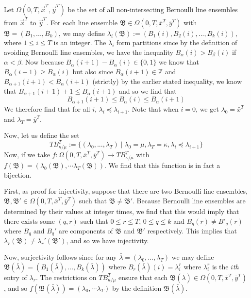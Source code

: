 \documentclass[12pt]{article}
\begin{document}
	Let $\Omega(0,T,\vec{x}^T, \vec{y}^T)$ be the set of all non-intersecting Bernoulli line ensembles from $\vec{x}^T$ to $\vec{y}^T$. For each line ensemble $\mathfrak{B}\in \Omega(0,T,\bar x^T,\bar y^T)$ with $\mathfrak B=(B_1,...,B_k)$, we may define $\lambda_i(\mathfrak B):=(B_1(i),B_2(i),...,B_k(i))$, where $1 \leqslant i\leqslant T$ is an integer. The $\lambda_i$ form partitions since by the definition of avoiding Bernoulli line ensembles, we have the inequality $B_\alpha(i)>B_\beta(i)$ if $\alpha<\beta$. 
Now because $B_\alpha(i+1)-B_\alpha(i)\in \{0,1\}$ we know that $B_\alpha(i+1)\geq B_\alpha(i)$ but also since $B_\alpha(i+1)\in \mathbb{Z}$ and $B_{\alpha+1}(i+1)<B_\alpha(i+1)$ (strictly) by the earlier stated inequality, we know that $B_{\alpha+1}(i+1)+1\leq B_\alpha(i+1)$ and so we find that 
\[B_{\alpha+1}(i+1)\leq B_\alpha(i)\leq B_\alpha(i+1)\]
We therefore find that for all $i$, $\lambda_i\preceq \lambda_{i+1}$. Note that when $i=0$, we get $\lambda_0=\bar x^T$ and $\lambda_T=\bar y^T$.

Now, let us define the set 
\[TB_{\kappa/\mu}^T:=\{(\lambda_0,...,\lambda_T)\mid \lambda_0=\mu, \lambda_T=\kappa, \lambda_i\preceq\lambda_{i+1}\}\] 
Now, if we take $f:\Omega(0,T,\bar x^T, \bar y ^T)\to TB_{\kappa/\mu}^T$ with $f(\mathfrak{B})= (\lambda_0(\mathfrak{B}),\cdots \lambda_T(\mathfrak{B}))$. We find that this function is in fact a bijection. 

First, as proof for injectivity, suppose that there are two Bernoulli line ensembles, $\mathfrak{B}, \mathfrak{B}'\in \Omega(0,T,\bar x^T, \bar y ^T)$ such that $\mathfrak{B}\neq \mathfrak{B'}$.
Because Bernoulli line ensembles are determined by their values at integer times, we find that this would imply that there exists some $(q,r)$ such that $0\leq r\leq T$, $0\leq q \leq k$ and $B_q(r)\neq B'_q(r)$ where $B_q$ and $B_q'$ are components of $\mathfrak{B}$ and $\mathfrak{B'}$ respectively. 
This implies that $\lambda_r(\mathfrak B)\neq \lambda_r'(\mathfrak{B'})$, and so we have injectivity. 

Now, surjectivity follows since for any $\bar\lambda=(\lambda_0,...,\lambda_T)$ we may define $\mathfrak{B}(\bar{\lambda})=(B_1(\bar\lambda),...,B_k(\bar\lambda))$ where $B_r(\bar\lambda)(i)=\lambda_i^r$ where $\lambda_i^r$ is the $i$\textit{th} entry of $\lambda_r$. The restrictions on $TB_{\kappa/\mu}^T$ ensure that each $\mathfrak{B}(\bar\lambda)\in \Omega(0,T,\bar x^T,\bar y^T)$, and so $f(\mathfrak B(\bar{\lambda}))=(\lambda_0,\cdots \lambda_T)$ by the definition $\mathfrak{B}(\bar\lambda)$. 
\end{document}
